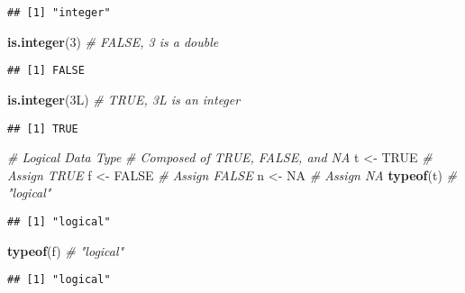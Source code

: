 \documentclass[
]{article}
\newenvironment{Shaded}{\begin{snugshade}}{\end{snugshade}}
\newcommand{\CommentTok}[1]{\textcolor[rgb]{0.56,0.35,0.01}{\textit{#1}}}
\newcommand{\ConstantTok}[1]{\textcolor[rgb]{0.56,0.35,0.01}{#1}}
\newcommand{\DataTypeTok}[1]{\textcolor[rgb]{0.13,0.29,0.53}{#1}}
\newcommand{\DecValTok}[1]{\textcolor[rgb]{0.00,0.00,0.81}{#1}}
\newcommand{\FunctionTok}[1]{\textcolor[rgb]{0.13,0.29,0.53}{\textbf{#1}}}
\newcommand{\NormalTok}[1]{#1}
\newcommand{\OtherTok}[1]{\textcolor[rgb]{0.56,0.35,0.01}{#1}}
\begin{document}
\begin{verbatim}
## [1] "integer"
\end{verbatim}

\begin{Shaded}
\begin{Highlighting}[]
\FunctionTok{is.integer}\NormalTok{(}\DecValTok{3}\NormalTok{)          }\CommentTok{\# FALSE, 3 is a double}
\end{Highlighting}
\end{Shaded}

\begin{verbatim}
## [1] FALSE
\end{verbatim}

\begin{Shaded}
\begin{Highlighting}[]
\FunctionTok{is.integer}\NormalTok{(}\DecValTok{3}\DataTypeTok{L}\NormalTok{)         }\CommentTok{\# TRUE, 3L is an integer}
\end{Highlighting}
\end{Shaded}

\begin{verbatim}
## [1] TRUE
\end{verbatim}

\begin{Shaded}
\begin{Highlighting}[]
\CommentTok{\# Logical Data Type}
\CommentTok{\# Composed of TRUE, FALSE, and NA}
\NormalTok{t }\OtherTok{\textless{}{-}} \ConstantTok{TRUE}              \CommentTok{\# Assign TRUE}
\NormalTok{f }\OtherTok{\textless{}{-}} \ConstantTok{FALSE}             \CommentTok{\# Assign FALSE}
\NormalTok{n }\OtherTok{\textless{}{-}} \ConstantTok{NA}                \CommentTok{\# Assign NA}
\FunctionTok{typeof}\NormalTok{(t)              }\CommentTok{\# "logical"}
\end{Highlighting}
\end{Shaded}

\begin{verbatim}
## [1] "logical"
\end{verbatim}

\begin{Shaded}
\begin{Highlighting}[]
\FunctionTok{typeof}\NormalTok{(f)              }\CommentTok{\# "logical"}
\end{Highlighting}
\end{Shaded}

\begin{verbatim}
## [1] "logical"
\end{verbatim}
\end{document}
